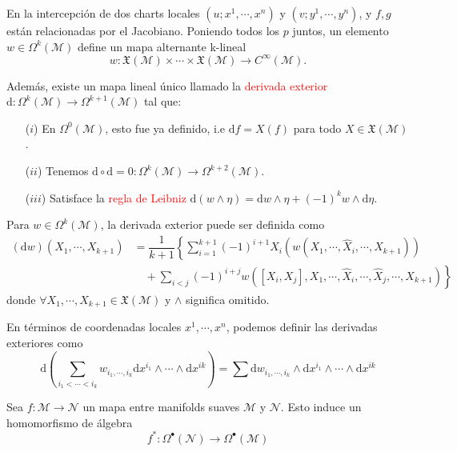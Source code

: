 \documentclass[../main]{subfiles}
\begin{document}
En la intercepción de dos charts locales $(u; x^1, \cdots, x^n)$ y $(v; y^1, \cdots, y^n)$, y $f, g$ están relacionadas por el Jacobiano. Poniendo todos los $p$ juntos, un elemento $w \in \Omega^k(\mathcal{M})$ define un mapa alternante k-lineal 
\begin{equation}
    w: \mathfrak{X}(\mathcal{M})\times \cdots \times \mathfrak{X}(\mathcal{M}) \rightarrow C^{\infty}(\mathcal{M}).
\end{equation} 

Además, existe un mapa lineal único llamado la \textcolor{red}{derivada exterior} $\mathrm{d}: \Omega^k(\mathcal{M})\rightarrow \Omega^{k+1}(\mathcal{M})$ tal que:
\begin{enumerate}
    \item[($i$)] En $\Omega^0(\mathcal{M})$, esto fue ya definido, i.e $\mathrm{d}f=X(f)$ para todo $X\in \mathfrak{X}(\mathcal{M})$.
    \item[($ii$)] Tenemos $\mathrm{d} \circ \mathrm{d}=0: \Omega^k(\mathcal{M})\rightarrow \Omega^{k+2}(\mathcal{M})$.
    \item[($iii$)] Satisface la \textcolor{red}{regla de Leibniz} $\mathrm{d}(w \wedge \eta)=\mathrm{d}w \wedge \eta+(-1)^k w \wedge \mathrm{d}\eta$. 
\end{enumerate}
Para $w \in \Omega^k(\mathcal{M})$, la derivada exterior puede ser definida como 
\begin{equation}
    \begin{split}
        (\mathrm{d}w)(X_1, \cdots, X_{k+1})&=\dfrac{1}{k+1}\left\{\sum_{i=1}^{k+1} (-1)^{i+1} X_i\left(w(X_1, \cdots, \hat{X}_i, \cdots, X_{k+1})\right)\right.\\
        &\quad +\left.\sum_{i<j}(-1)^{i+j}w\left([X_i, X_j], X_1, \cdots, \hat{X}_i, \cdots, \hat{X}_j, \cdots, X_{k+1}\right)\right\}
    \end{split}
\end{equation}
donde $\forall X_1, \cdots, X_{k+1} \in \mathfrak{X}(\mathcal{M})$ y $\wedge$ significa omitido.

En términos de coordenadas locales $x^1, \cdots, x^n$, podemos definir las derivadas exteriores como 
\begin{equation}
    \mathrm{d}\left(\sum_{i_1<\cdots<i_k} w_{i_1, \cdots, i_k}\mathrm{d}x^{i_1}\wedge\cdots \wedge \mathrm{d}x^{ik}\right)=\sum \mathrm{d}w_{i_1, \cdots, i_k}\wedge \mathrm{d}x^{i_1}\wedge \cdots \wedge \mathrm{d}x^{ik}
\end{equation}

Sea $f: \mathcal{M}\rightarrow \mathcal{N}$ un mapa entre manifolds suaves $\mathcal{M}$ y $\mathcal{N}$. Esto induce un homomorfismo de álgebra 
\begin{equation}
    f^*: \Omega^{\bullet}(\mathcal{N})\rightarrow \Omega^{\bullet}(\mathcal{M})
\end{equation}
\end{document}
